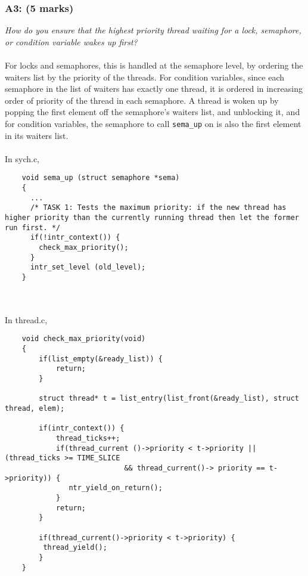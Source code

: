 \documentclass{article}
\begin{document}
\subsubsection*{A3: (5 marks) }
\textit{How do you ensure that the highest priority thread waiting for a lock, semaphore, or condition variable wakes up first?}
\\ \\
For locks and semaphores, this is handled at the semaphore level, by ordering the waiters list by the priority of the threads. For condition variables, since each semaphore in the list of waiters has exactly one thread, it is ordered in increasing order of priority of the thread in each semaphore.
A thread is woken up by popping the first element off the semaphore's waiters list, and unblocking it, and for condition variables, the semaphore to call \texttt{sema\_up} on is also the first element in its waiters list.
\\\\
In sych.c,
\begin{lstlisting}
    void sema_up (struct semaphore *sema)
    {
      ...
      /* TASK 1: Tests the maximum priority: if the new thread has higher priority than the currently running thread then let the former run first. */
      if(!intr_context()) {
        check_max_priority();
      }
      intr_set_level (old_level);
    }
\end{lstlisting}
\\\\
In thread.c, 
\begin{lstlisting}
    void check_max_priority(void)
    {
        if(list_empty(&ready_list)) {
            return;
        }

        struct thread* t = list_entry(list_front(&ready_list), struct thread, elem);

        if(intr_context()) {
            thread_ticks++;
            if(thread_current ()->priority < t->priority || (thread_ticks >= TIME_SLICE
                            && thread_current()-> priority == t->priority)) {
               ntr_yield_on_return();
            }
            return;
        }

        if(thread_current()->priority < t->priority) {
         thread_yield();
        }
    }

\end{lstlisting}
\end{document}
